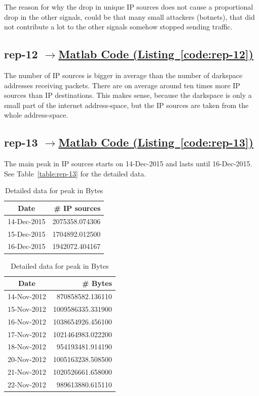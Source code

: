 \documentclass{article}
\newcommand{\codelink}[1]{%
    \hyperref[#1]{\quad$\rightarrow$\enskip Matlab Code (Listing~\ref{#1})}%
}
\begin{document}
The reason for why the drop in unique IP sources does not cause a proportional drop in the other
signals, could be that many small attackers (botnets), that did not contribute a lot to the other
signals somehow stopped sending traffic.

\subsection{rep-12 \codelink{code:rep-12}}

The number of IP sources is bigger in average than the number of darkspace addresses
receiving packets. There are on average around ten times more IP sources than IP destinations.
This makes sense, because the darkspace is only a small part of the internet address-space, but
the IP sources are taken from the whole address-space.

\subsection{rep-13 \codelink{code:rep-13}}

The main peak in IP sources starts on 14-Dec-2015 and lasts until 16-Dec-2015. See Table~\ref{table:rep-13}
for the detailed data.

\begin{table}[H]
    \parbox{.5\linewidth}{
        \centering
        \begin{tabular}{c|r}
            Date & \# IP sources \\
            \hline
            14-Dec-2015 & 2075358.074306 \\
            15-Dec-2015 & 1704892.012500 \\
            16-Dec-2015 & 1942072.404167 \\
        \end{tabular}
        \caption{\label{table:rep-13} Detailed data for peak in IP sources}
    }
    \parbox{.5\linewidth}{
        \centering
        \begin{tabular}{c|r}
            Date & \# Bytes \\
            \hline
            14-Nov-2012& 870858582.136110 \\ 
            15-Nov-2012& 1009586335.331900 \\
            16-Nov-2012& 1038654926.456100 \\
            17-Nov-2012& 1021464983.022200 \\
            18-Nov-2012& 954193481.914190 \\ 
            20-Nov-2012& 1005163238.508500 \\
            21-Nov-2012& 1020526661.658000 \\
            22-Nov-2012& 989613880.615110  \\
        \end{tabular}
        \caption{\label{table:rep-13-optional} Detailed data for peak in Bytes}
    }
\end{table}
\end{document}
